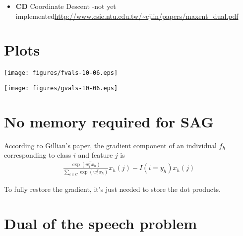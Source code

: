 \documentclass{article}
\begin{document}
\begin{itemize}
\item \textbf{CD}  Coordinate Descent -not yet implemented\url{http://www.csie.ntu.edu.tw/~cjlin/papers/maxent_dual.pdf} \\
\end{itemize} 


\section*{Plots}


\begin{center}
\texttt{[image: figures/fvals-10-06.eps]} 
\end{center}

\begin{center}
\texttt{[image: figures/gvals-10-06.eps]} 
\end{center}



\newpage

\section*{No memory required for SAG}

According to Gillian's paper, the gradient component of an individual $f_h$ corresponding to class $i$ and feature $j$ is
\begin{align*}
\frac{\exp(w_i^Tx_h)}{\sum_{c \in C} \exp(w_c^T x_h)} x_h(j) - I(i = y_h) x_h(j)
\end{align*}

To fully restore the gradient, it's just needed to store the dot products.

\section*{Dual of the speech problem}
\end{document}
